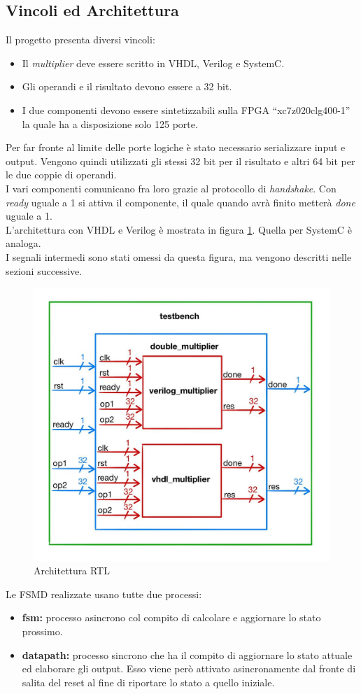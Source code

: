 \documentclass[]{IEEEtran}
\begin{document}
\subsection{Vincoli ed Architettura}
Il progetto presenta diversi vincoli:
\begin{itemize}
    \item Il \textit{multiplier} deve essere scritto in VHDL, Verilog e SystemC.
    \item Gli operandi e il risultato devono essere a 32 bit.
    \item I due componenti devono essere sintetizzabili sulla FPGA ``xc7z020clg400-1'' la quale ha a disposizione solo 125 porte.
\end{itemize}
Per far fronte al limite delle porte logiche è stato necessario serializzare input e output. Vengono quindi utilizzati gli stessi 32 bit per il risultato e altri 64 bit per le due coppie di operandi.
\\I vari componenti comunicano fra loro grazie al protocollo di \textit{handshake}. Con \textit{ready} uguale a 1 si attiva il componente, il quale quando avrà finito metterà \textit{done} uguale a 1.
\\L'architettura con VHDL e Verilog è mostrata in figura \ref{fig:Architettura}. Quella per SystemC è analoga.
\\I segnali intermedi sono stati omessi da questa figura, ma vengono descritti nelle sezioni successive.
\begin{figure}[!htb]
    \centering
    \includegraphics[width=0.8\linewidth]{figures/architettura.jpg}
    \caption{Architettura RTL}
    \label{fig:Architettura}
\end{figure}
Le FSMD realizzate usano tutte due processi:
\begin{itemize}
    \item \textbf{fsm:} processo asincrono col compito di calcolare e aggiornare lo stato prossimo.
    \item \textbf{datapath:} processo sincrono che ha il compito di aggiornare lo stato attuale ed elaborare gli output. Esso viene però attivato asincronamente dal fronte di salita del reset al fine di riportare lo stato a quello iniziale.
\end{itemize}
\end{document}
